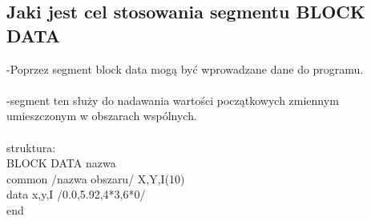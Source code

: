 \subsection{Jaki jest cel stosowania segmentu BLOCK DATA}
-Poprzez segment block data mogą być wprowadzane dane do programu.
\\
\\
-segment ten służy do nadawania wartości początkowych zmiennym umieszczonym w obszarach wspólnych.
\\
\\
struktura: 
\\
BLOCK DATA nazwa
\\
common /nazwa obszaru/ X,Y,I(10)
\\
data x,y,I /0.0,5.92,4*3,6*0/
\\
end